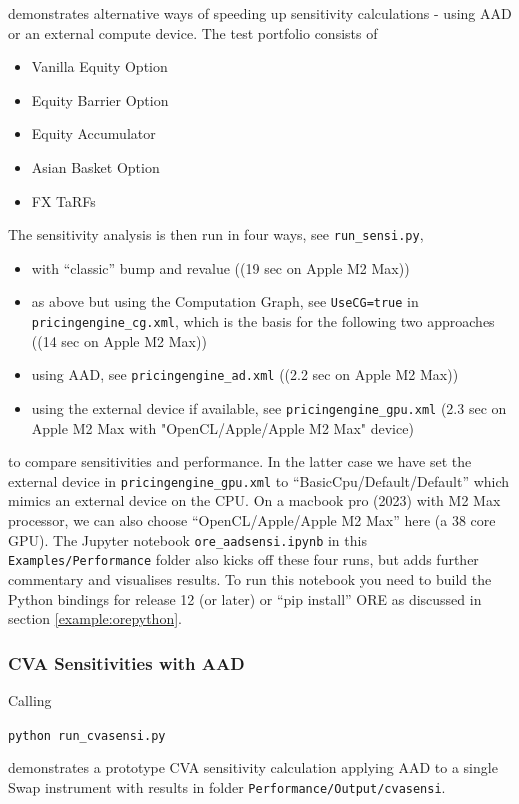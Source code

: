 \medskip
demonstrates alternative ways of speeding up sensitivity calculations - using AAD or an external compute device.
The test portfolio consists of 
\begin{itemize}
\item Vanilla Equity Option
\item Equity Barrier Option
\item Equity Accumulator
\item Asian Basket Option
\item FX TaRFs
\end{itemize}
The sensitivity analysis is then run in four ways, see {\tt run\_sensi.py},
\begin{itemize}
\item with ``classic'' bump and revalue ((19 sec on Apple M2 Max))
\item as above but using the Computation Graph, see {\tt UseCG=true} in {\tt pricingengine\_cg.xml}, which
  is the basis for the following two approaches ((14 sec on Apple M2 Max))
\item using AAD, see {\tt pricingengine\_ad.xml} ((2.2 sec on Apple M2 Max))
\item using the external device if available, see {\tt pricingengine\_gpu.xml} (2.3 sec on Apple M2 Max with "OpenCL/Apple/Apple M2 Max" device) 
\end{itemize}
to compare sensitivities and performance. In the latter case we have set the external device in
{\tt pricingengine\_gpu.xml} to ``BasicCpu/Default/Default'' which mimics an external device on the CPU.
On a macbook pro (2023) with M2 Max processor, we can also choose  
``OpenCL/Apple/Apple M2 Max'' here (a 38 core GPU).
The Jupyter notebook {\tt ore\_aadsensi.ipynb} in this {\tt Examples/Performance} folder also kicks
off these four runs, but adds further commentary and visualises results.
To run this notebook you need to build the Python bindings for release 12 (or later)
or ``pip install'' ORE as discussed in section \ref{example:orepython}.

\subsubsection{CVA Sensitivities with AAD}

Calling
\medskip
\centerline {\tt python run\_cvasensi.py} 

\medskip
demonstrates a prototype CVA sensitivity calculation applying AAD to a single Swap instrument
with results in folder {\tt Performance/Output/cvasensi}.

